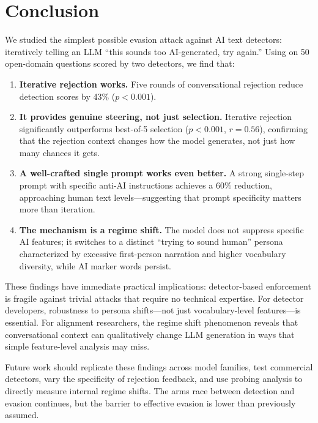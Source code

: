 \section{Conclusion}
\label{sec:conclusion}

We studied the simplest possible evasion attack against AI text detectors: iteratively telling an LLM ``this sounds too AI-generated, try again.'' Using \gptfour on 50 open-domain questions scored by two detectors, we find that:

\begin{enumerate}[leftmargin=*,itemsep=2pt,topsep=2pt]
    \item \textbf{Iterative rejection works.} Five rounds of conversational rejection reduce \binoculars detection scores by 43\% ($p < 0.001$).
    \item \textbf{It provides genuine steering, not just selection.} Iterative rejection significantly outperforms best-of-5 selection ($p < 0.001$, $r = 0.56$), confirming that the rejection context changes how the model generates, not just how many chances it gets.
    \item \textbf{A well-crafted single prompt works even better.} A strong single-step prompt with specific anti-AI instructions achieves a 60\% reduction, approaching human text levels---suggesting that prompt specificity matters more than iteration.
    \item \textbf{The mechanism is a regime shift.} The model does not suppress specific AI features; it switches to a distinct ``trying to sound human'' persona characterized by excessive first-person narration and higher vocabulary diversity, while AI marker words persist.
\end{enumerate}

These findings have immediate practical implications: detector-based enforcement is fragile against trivial attacks that require no technical expertise. For detector developers, robustness to persona shifts---not just vocabulary-level features---is essential. For alignment researchers, the regime shift phenomenon reveals that conversational context can qualitatively change LLM generation in ways that simple feature-level analysis may miss.

Future work should replicate these findings across model families, test commercial detectors, vary the specificity of rejection feedback, and use probing analysis to directly measure internal regime shifts. The arms race between detection and evasion continues, but the barrier to effective evasion is lower than previously assumed.

